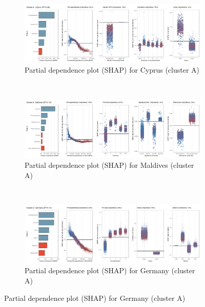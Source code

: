 \begin{figure}[ht!]\ContinuedFloat
    \centering
   \begin{subfigure}[b]{\textwidth}
         \centering
         \caption{Partial dependence plot (SHAP) for Cyprus (cluster A)}
         \label{fig:5b_CYP}
         \includegraphics[width=\textwidth]{Figure 5b/Figure_5b_CYP}         
     \end{subfigure}
    \\
    \vspace{0.5cm}
   \begin{subfigure}[b]{\textwidth}
         \centering
         \caption{Partial dependence plot (SHAP) for Maldives (cluster A)}
         \label{fig:5b_MDV}
         \includegraphics[width=\textwidth]{Figure 5b/Figure_5b_MDV}         
     \end{subfigure}
    \\
    \vspace{0.5cm}
   \begin{subfigure}[b]{\textwidth}
         \centering
         \caption{Partial dependence plot (SHAP) for Germany (cluster A)}
         \label{fig:5b_DEU}
         \includegraphics[width=\textwidth]{Figure 5b/Figure_5b_DEU}

\end{subfigure}
\end{figure}
